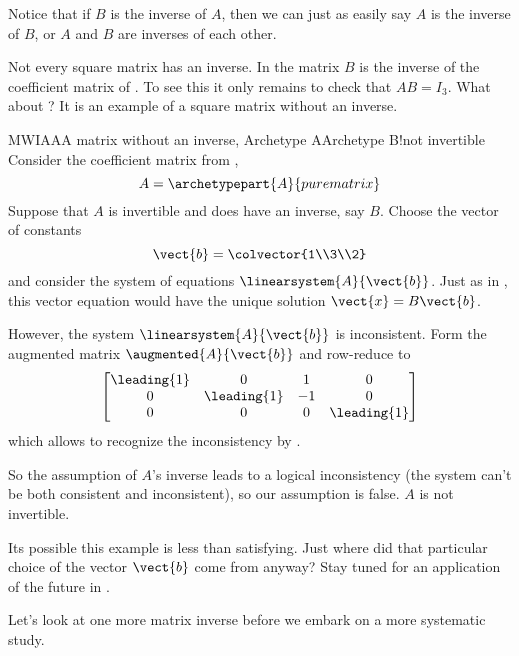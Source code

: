 %
Notice that if $B$ is the inverse of $A$, then we can just as easily say $A$ is the inverse of $B$, or $A$ and $B$ are inverses of each other.\par
%
Not every square matrix has an inverse.  In  the matrix $B$ is the inverse of the coefficient matrix of .  To see this it only remains to check that $AB=I_3$.  What about ?  It is an example of a square matrix without an inverse.
%
\begin{example}{MWIAA}{A matrix without an inverse, Archetype A}{Archetype B!not invertible}
Consider the coefficient matrix from ,
%
\begin{equation*}
A=\archetypepart{A}{purematrix}
\end{equation*}
%
Suppose that $A$ is invertible and does have an inverse, say $B$.  Choose the vector of constants
%
\begin{equation*}
\vect{b}=\colvector{1\\3\\2}
\end{equation*}
%
and consider the system of equations $\linearsystem{A}{\vect{b}}$.  Just as in , this vector equation would have the unique solution $\vect{x}=B\vect{b}$.\par
%
However, the system $\linearsystem{A}{\vect{b}}$ is inconsistent.  Form the augmented matrix $\augmented{A}{\vect{b}}$ and row-reduce to
%
\begin{equation*}
\begin{bmatrix}
\leading{1} & 0 & 1 & 0\\
0 & \leading{1} & -1 & 0\\
0 & 0 & 0 & \leading{1}
\end{bmatrix}
\end{equation*}
%
which allows to recognize the inconsistency by .\par
%
So the assumption of $A$'s inverse leads to a logical inconsistency (the system can't be both consistent and inconsistent), so our assumption is false.  $A$ is not invertible.\par
%
Its possible this example is less than satisfying.  Just where did that particular choice of the vector $\vect{b}$ come from anyway?  Stay tuned for an application of the future  in .
%
\end{example}
%
Let's look at one more matrix inverse before we embark on a more systematic study.
